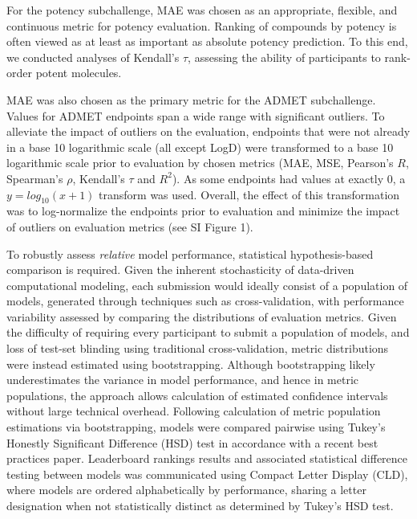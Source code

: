 \documentclass[journal=jcim,manuscript=article]{achemso}
\begin{document}
For the potency subchallenge, MAE was chosen as an appropriate, flexible, and continuous metric for potency evaluation. Ranking of compounds by potency is often viewed as at least as important as absolute potency prediction\cite{parks_gaieb_chiu_yang_shao_walters_jansen_mcgaughey_lewis_bembenek_et}. To this end, we conducted analyses of Kendall's $\tau$, assessing the ability of participants to rank-order potent molecules. 

MAE was also chosen as the primary metric for the ADMET subchallenge. Values for ADMET endpoints span a wide range with significant outliers. To alleviate the impact of outliers on the evaluation, endpoints that were not already in a base 10 logarithmic scale (all except LogD) were transformed to a base 10 logarithmic scale prior to evaluation by chosen metrics (MAE, MSE, Pearson's $R$, Spearman's $\rho$, Kendall's $\tau$ and $R^2$). As some endpoints had values at exactly 0, a $ y=log_{10}(x + 1)$ transform was used. Overall, the effect of this transformation was to log-normalize the endpoints prior to evaluation and minimize the impact of outliers on evaluation metrics (see SI Figure 1).

To robustly assess \textit{relative} model performance, statistical hypothesis-based comparison is required\cite{ash_practically_2024}. Given the inherent stochasticity of data-driven computational modeling, each submission would ideally consist of a population of models, generated through techniques such as cross-validation, with performance variability assessed by comparing the distributions of evaluation metrics. Given the difficulty of requiring every participant to submit a population of models, and loss of test-set blinding using traditional cross-validation, metric distributions were instead estimated using bootstrapping\cite{efron_bootstrap_1979}. Although bootstrapping likely underestimates the variance in model performance, and hence in metric populations, the approach allows calculation of estimated confidence intervals without large technical overhead. Following calculation of metric population estimations via bootstrapping, models were compared pairwise using Tukey's Honestly Significant Difference (HSD) test in accordance with a recent best practices paper\cite{ash_practically_2024}. Leaderboard rankings results and associated statistical difference testing between models was communicated using Compact Letter Display (CLD)\cite{cld_algorithm_2004}, where models are ordered alphabetically by performance, sharing a letter designation when not statistically distinct as determined by Tukey's HSD test. 
\end{document}
